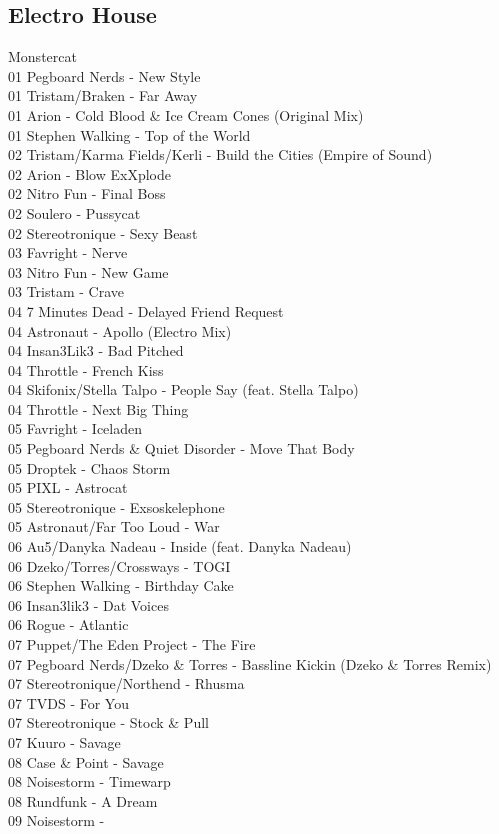 \begin{multicols}{2}
 \subsection*{Electro House}
\large Monstercat \normalsize\\
 01 Pegboard Nerds - New Style\\ 01 Tristam/Braken - Far Away\\ 01 Arion - Cold Blood \& Ice Cream Cones (Original Mix)\\ 01 Stephen Walking - Top of the World\\ 02 Tristam/Karma Fields/Kerli - Build the Cities (Empire of Sound)\\ 02 Arion - Blow ExXplode\\ 02 Nitro Fun - Final Boss\\ 02 Soulero - Pussycat\\ 02 Stereotronique - Sexy Beast\\ 03 Favright - Nerve\\ 03 Nitro Fun - New Game\\ 03 Tristam - Crave\\ 04 7 Minutes Dead - Delayed Friend Request\\ 04 Astronaut - Apollo (Electro Mix)\\ 04 Insan3Lik3 - Bad Pitched\\ 04 Throttle - French Kiss\\ 04 Skifonix/Stella Talpo - People Say (feat. Stella Talpo)\\ 04 Throttle - Next Big Thing\\ 05 Favright - Iceladen\\ 05 Pegboard Nerds \& Quiet Disorder - Move That Body\\ 05 Droptek - Chaos Storm\\ 05 PIXL - Astrocat\\ 05 Stereotronique - Exsoskelephone\\ 05 Astronaut/Far Too Loud - War\\ 06 Au5/Danyka Nadeau - Inside (feat. Danyka Nadeau)\\ 06 Dzeko/Torres/Crossways - TOGI\\ 06 Stephen Walking - Birthday Cake\\ 06 Insan3lik3 - Dat Voices\\ 06 Rogue - Atlantic\\ 07 Puppet/The Eden Project - The Fire\\ 07 Pegboard Nerds/Dzeko \& Torres - Bassline Kickin (Dzeko \& Torres Remix)\\ 07 Stereotronique/Northend - Rhusma\\ 07 TVDS - For You\\ 07 Stereotronique - Stock \& Pull\\ 07 Kuuro - Savage\\ 08 Case \& Point - Savage\\ 08 Noisestorm - Timewarp\\ 08 Rundfunk - A Dream\\ 09 Noisestorm - 
\end{multicols}
